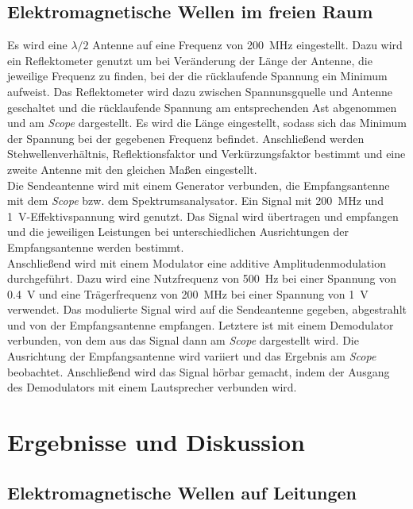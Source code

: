 \documentclass[a4paper,twoside,final]{article}
\begin{document}
\subsection{Elektromagnetische Wellen im freien Raum}
Es wird eine $\lambda/2$ Antenne auf eine Frequenz von \SI{200}{\mega\hertz} eingestellt. Dazu wird ein Reflektometer genutzt um bei Veränderung der Länge der Antenne, die jeweilige Frequenz zu finden, bei der die rücklaufende Spannung ein Minimum aufweist. Das Reflektometer wird dazu zwischen Spannunsgquelle und Antenne geschaltet und die rücklaufende Spannung am entsprechenden Ast abgenommen und am \textit{Scope} dargestellt. Es wird die Länge eingestellt, sodass sich das Minimum der Spannung bei der gegebenen Frequenz befindet. Anschließend werden Stehwellenverhältnis, Reflektionsfaktor und Verkürzungsfaktor bestimmt und eine zweite Antenne mit den gleichen Maßen eingestellt. \\
Die Sendeantenne wird mit einem Generator verbunden, die Empfangsantenne mit dem \textit{Scope} bzw. dem Spektrumsanalysator. Ein Signal mit \SI{200}{\mega\hertz} und \SI{1}{\volt}-Effektivspannung wird genutzt. Das Signal wird übertragen und empfangen und die jeweiligen Leistungen bei unterschiedlichen Ausrichtungen der Empfangsantenne werden bestimmt. \\
Anschließend wird mit einem Modulator eine additive Amplitudenmodulation durchgeführt. Dazu wird eine Nutzfrequenz von \SI{500}{\hertz} bei einer Spannung von \SI{0,4}{\volt} und eine Trägerfrequenz von \SI{200}{\mega\hertz} bei einer Spannung von \SI{1}{\volt} verwendet. Das modulierte Signal wird auf die Sendeantenne gegeben, abgestrahlt und von der Empfangsantenne empfangen. Letztere ist mit einem Demodulator verbunden, von dem aus das Signal dann am \textit{Scope} dargestellt wird. Die Ausrichtung der Empfangsantenne wird variiert und das Ergebnis am \textit{Scope} beobachtet. Anschließend wird das Signal hörbar gemacht, indem der Ausgang des Demodulators mit einem Lautsprecher verbunden wird.
\newpage
\section{Ergebnisse und Diskussion}
\subsection{Elektromagnetische Wellen auf Leitungen}
\end{document}
